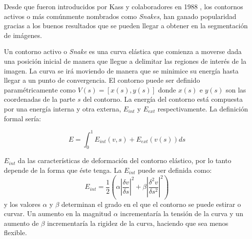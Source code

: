 Desde que fueron introducidos por Kass y colaboradores en 1988 \cite{kass1}, los contornos activos o m\'{a}s com\'{u}nmente nombrados como \textit{Snakes}, han ganado popularidad gracias a los buenos resultados que se pueden llegar a obtener en la segmentaci\'{o}n de im\'{a}genes. 

Un contorno activo o \textit{Snake} es una curva el\'{a}stica que comienza a moverse dada una posici\'{o}n inicial de manera que llegue a delimitar las regiones de inter\'{e}s de la imagen. La curva se ir\'{a} moviendo de manera que se minimice su energ\'{i}a hasta llegar a un punto de convergencia. El contorno puede ser definido param\'{e}tricamente como $V(s) = [x(s),y(s)]$ donde $x(s)$ e $y(s)$ son las coordenadas de la parte $s$ del contorno. La energ\'{i}a del contorno est\'{a} compuesta por una energ\'{i}a interna y otra externa, $E_{int}$ y $E_{ext}$ respectivamente. La definici\'{o}n formal ser\'{i}a:

\begin{equation}
E = \int_{0}^{1}E_{int}(v,s) + E_{ext}(v(s)) ds
\end{equation}

$E_{int}$ da las caracter\'{i}sticas de deformaci\'{o}n del contorno el\'{a}stico, por lo tanto depende de la forma que \'{e}ste tenga. La $E_{int}$ puede ser definida como:
\begin{equation}
E_{int} = \frac{1}{2} (\alpha|\frac{\delta v}{\delta s}|^2 + \beta|\frac{\delta^2 v}{\delta s^2}| ^2)
\end{equation}
y los valores $\alpha$ y $\beta$ determinan el grado en el que el contorno se puede estirar o curvar. Un aumento en la magnitud $\alpha$ incrementar\'{i}a la tensi\'{o}n de la curva y un aumento de $\beta$ incrementar\'{i}a la rigidez de la curva, haciendo que sea menos flexible.

